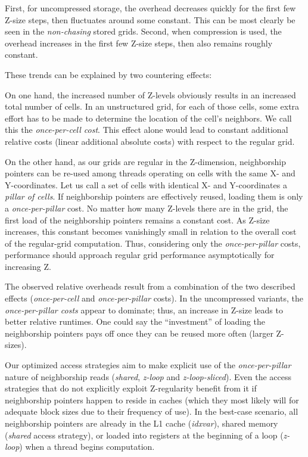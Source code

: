 First, for uncompressed storage, the overhead decreases quickly for the first few Z-size steps, then fluctuates around some constant. This can be most clearly be seen in the \emph{non-chasing} stored grids. Second, when compression is used, the overhead increases in the first few Z-size steps, then also remains roughly constant.

These trends can be explained by two countering effects:

On one hand, the increased number of Z-levels obviously results in an increased total number of cells. In an unstructured grid, for each of those cells, some extra effort has to be made to determine the location of the cell's neighbors. We call this the \emph{once-per-cell cost}. This effect alone would lead to constant additional relative costs (linear additional absolute costs) with respect to the regular grid.

On the other hand, as our grids are regular in the Z-dimension, neighborship pointers can be re-used among threads operating on cells with the same X- and Y-coordinates. Let us call a set of cells with identical X- and Y-coordinates a \emph{pillar of cells}. If neighborship pointers are effectively reused, loading them is only a \emph{once-per-pillar} cost. No matter how many Z-levels there are in the grid, the first load of the neighborship pointers remains a constant cost. As Z-size increases, this constant becomes vanishingly small in relation to the overall cost of the regular-grid computation. Thus, considering only the \emph{once-per-pillar} costs, performance should approach regular grid performance asymptotically for increasing Z. 

The observed relative overheads result from a combination of the two described effects (\emph{once-per-cell} and \emph{once-per-pillar} costs). In the uncompressed variants, the \emph{once-per-pillar costs} appear to dominate; thus, an increase in Z-size leads to better relative runtimes. One could say the ``investment'' of loading the neighborship pointers pays off once they can be reused more often (larger Z-sizes).

Our optimized access strategies aim to make explicit use of the \emph{once-per-pillar} nature of neighborship reads (\emph{shared}, \emph{z-loop} and \emph{z-loop-sliced}). Even the access strategies that do not explicitly exploit Z-regularity benefit from it if neighborship pointers happen to reside in caches (which they most likely will for adequate block sizes due to their frequency of use).  In the best-case scenario, all neighborship pointers are already in the L1 cache (\emph{idxvar}), shared memory (\emph{shared} access strategy), or loaded into registers at the beginning of a loop (\emph{z-loop}) when a thread begins computation.


